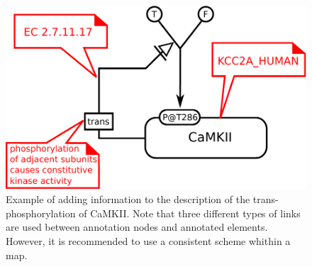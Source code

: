 \begin{figure}[H]
  \centering
  \includegraphics[scale = 0.5]{examples/ex-annotation}
  \caption{Example of  adding information to the description of the trans-phosphorylation of CaMKII. Note that three different types of links are used between annotation nodes and annotated elements. However, it is recommended to use a consistent scheme whithin a map.}
  \label{fig:ex-annotation}
\end{figure}


